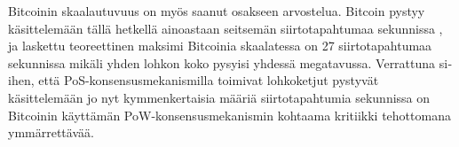 \begin{otherlanguage}{english}
Bitcoinin skaalautuvuus on myös saanut osakseen arvostelua. Bitcoin pystyy käsittelemään tällä hetkellä ainoastaan seitsemän siirtotapahtumaa sekunnissa \cite{bitcoin-tps}, ja laskettu teoreettinen maksimi Bitcoinia skaalatessa on 27 siirtotapahtumaa sekunnissa mikäli yhden lohkon koko pysyisi yhdessä megatavussa. Verrattuna siihen, että PoS-konsensusmekanismilla toimivat lohkoketjut pystyvät käsittelemään jo nyt kymmenkertaisia määriä siirtotapahtumia sekunnissa \cite{algorandtech, cardano-ouroboros} on Bitcoinin käyttämän PoW-konsensusmekanismin kohtaama kritiikki tehottomana ymmärrettävää.

\end{otherlanguage}